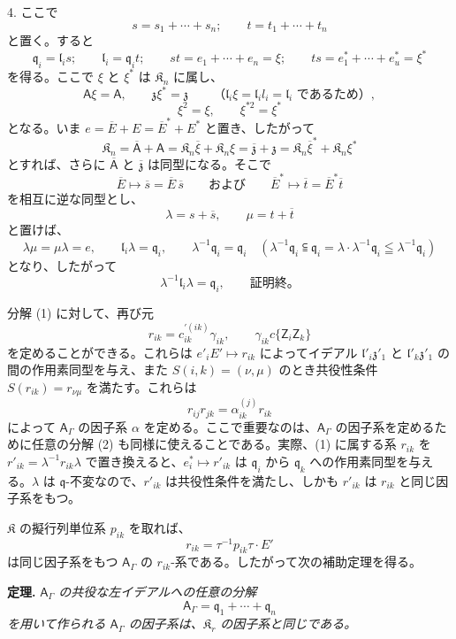 4. ここで
\[
s=s_1+\cdots+s_n;\qquad t=t_1+\cdots+t_n
\]
と置く。すると
\[
\mathfrak q_i=\mathfrak l_is;\qquad
\mathfrak l_i=\mathfrak q_it;\qquad
st=e_1+\cdots+e_n=\xi;\qquad
ts=e_1^*+\cdots+e_u^*=\xi^*
\]
を得る。ここで \(\xi\) と \(\xi^*\) は \(\mathfrak K_n\) に属し、
\[
\mathsf{A}\xi=\mathsf{A},\qquad \mathfrak z\xi^*=\mathfrak z\quad
\quad\text{（}\mathfrak l_i\xi=\mathfrak l_il_i=\mathfrak l_i\text{ であるため）},
\]
\[
\xi^2=\xi,\qquad \xi^{*2}=\xi^*
\]
となる。いま \(e=\overline E+E=\overline E^*+E^*\) と置き、したがって
\[
\mathfrak K_n=\overline{\mathsf A}+\mathsf{A}
=\mathfrak K_n\overline\xi+\mathfrak K_n\xi
=\overline{\mathfrak z}+\mathfrak z
=\mathfrak K_n\overline\xi^*+\mathfrak K_n\xi^*
\]
とすれば、さらに \(\overline{\mathsf A}\) と \(\overline{\mathfrak z}\) は同型になる。そこで
\[
\overline E\mapsto\overline s=\overline E\,\overline s
\qquad\text{および}\qquad
\overline E^*\mapsto\overline t=\overline E^*\overline t
\]
を相互に逆な同型とし、
\[
\lambda=s+\overline s,\qquad \mu=t+\overline t
\]
と置けば、
\[
\lambda\mu=\mu\lambda=e,\qquad
\mathfrak l_i\lambda=\mathfrak q_i,\qquad
\lambda^{-1}\mathfrak q_i=\mathfrak q_i
\quad
(\lambda^{-1}\mathfrak q_i\subseteqq\mathfrak q_i
=\lambda\cdot\lambda^{-1}\mathfrak q_i\leqq\lambda^{-1}\mathfrak q_i)
\]
となり、したがって
\[
\lambda^{-1}\mathfrak l_i\lambda=\mathfrak q_i,\qquad \text{証明終。}
\]

分解 (1) に対して、再び元
\[
r_{ik}=c_{ik}^{\prime(ik)}\gamma_{ik},\qquad \gamma_{ik}c\{\mathsf{Z}_i\mathsf{Z}_k\}
\]
を定めることができる。これらは \(e'_iE'\mapsto r_{ik}\) によってイデアル \(\mathfrak l'_i\mathfrak z'_1\) と \(\mathfrak l'_k\mathfrak z'_1\) の間の作用素同型を与え、また \(S(i,k)=(\nu,\mu)\) のとき共役性条件 \(S(r_{ik})=r_{\nu\mu}\) を満たす。これらは
\[
r_{ij}r_{jk}=\alpha_{ik}^{(j)}r_{ik}
\]
によって \(\mathsf{A}_\Gamma\) の因子系 \(\alpha\) を定める。ここで重要なのは、\(\mathsf{A}_\Gamma\) の因子系を定めるために任意の分解 (2) も同様に使えることである。実際、(1) に属する系 \(r_{ik}\) を \(r'_{ik}=\lambda^{-1}r_{ik}\lambda\) で置き換えると、\(e_i^*\mapsto r'_{ik}\) は \(\mathfrak q_i\) から \(\mathfrak q_k\) への作用素同型を与える。\(\lambda\) は \(\mathfrak q\)-不変なので、\(r'_{ik}\) は共役性条件を満たし、しかも \(r'_{ik}\) は \(r_{ik}\) と同じ因子系をもつ。

\(\mathfrak K\) の擬行列単位系 \(p_{ik}\) を取れば、
\[
r_{ik}=\tau^{-1}p_{ik}\tau\cdot E'
\]
は同じ因子系をもつ \(\mathsf{A}_\Gamma\) の \(r_{ik}\)-系である。したがって次の補助定理を得る。

\textbf{定理.} \emph{\(\mathsf{A}_\Gamma\) の共役な左イデアルへの任意の分解}
\[
\mathsf{A}_\Gamma=\mathfrak q_1+\cdots+\mathfrak q_n
\]
\emph{を用いて作られる \(\mathsf{A}_\Gamma\) の因子系は、\(\mathfrak K_r\) の因子系と同じである。}

